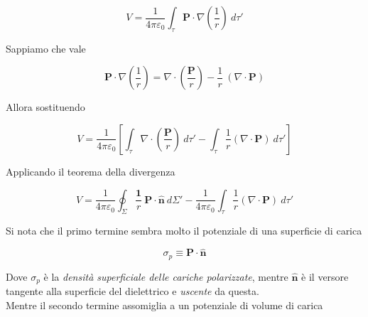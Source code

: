 \begin{equation*}
    V = \frac{1}{4 \pi \varepsilon_0} \int_{\tau} \mathbf{P} \cdot \nabla \left(\frac{1}{r} \right) \ d\tau '
\end{equation*}

Sappiamo che vale 

\begin{equation*}
    \mathbf{P} \cdot \nabla \left(\frac{1}{r} \right) = \nabla \cdot \left(\frac{\mathbf{P}}{r} \right) - \frac{1}{r} \ (\nabla \cdot \mathbf{P})
\end{equation*}

Allora sostituendo

\begin{equation*}
     V = \frac{1}{4 \pi \varepsilon_0} \left [ \int_{\tau}  \nabla \cdot \left(\frac{\mathbf{P}}{r} \right) \ d\tau ' - \int_{\tau} \frac{1}{r} (\nabla \cdot \mathbf{P}) \ d \tau '\right ]
\end{equation*}

Applicando il teorema della divergenza 

\begin{tcolorbox}[colback=yellow!10!white, colframe=orange!70!black, boxrule=0.8pt]
\begin{equation}
         V = \frac{1}{4 \pi \varepsilon_0}  \oint_{\Sigma}  \frac{\mathbf{1}}{r} \ \mathbf{P} \cdot \mathbf{\hat{n}} \ d\Sigma ' - \frac{1}{4 \pi \varepsilon_0} \int_{\tau} \frac{1}{r} (\nabla \cdot \mathbf{P}) \ d \tau '
\end{equation}
\end{tcolorbox}

Si nota che il primo termine sembra molto il potenziale di una superficie di carica 

\begin{tcolorbox}[colback=yellow!10!white, colframe=orange!70!black, boxrule=0.8pt]
\begin{equation}
    \sigma_p \equiv \mathbf{P} \cdot \mathbf{\hat{n}}
\end{equation}
\end{tcolorbox}

Dove $\sigma_p$ è la  \emph{densità superficiale delle cariche polarizzate}, mentre $\mathbf{\hat{n}}$ è il versore tangente alla superficie del dielettrico e \emph{uscente} da questa. \\

Mentre il secondo termine assomiglia a un potenziale di volume di carica 

